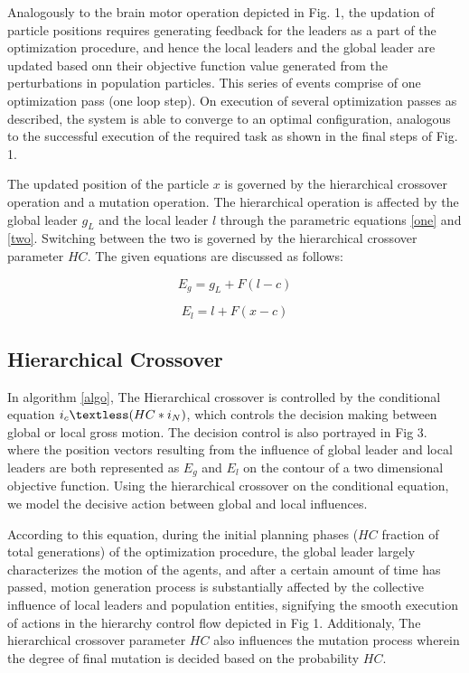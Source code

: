 Analogously to the brain motor operation depicted in Fig. 1, the updation of particle positions requires generating feedback for the leaders as a part of the optimization procedure, and hence the local leaders and the global leader are updated based onn their objective function value generated from the perturbations in population particles. This series of events comprise of one optimization pass (one loop step). On execution of several optimization passes as described, the system is able to converge to an optimal configuration, analogous to the successful execution of the required task as shown in the final steps of Fig. 1.

The updated position of the particle $x$ is governed by the hierarchical crossover operation and a mutation operation. The hierarchical operation is affected by the global leader $g_L$ and the local leader $l$ through the parametric equations \eqref{one} and \eqref{two}. Switching between the two is governed by the hierarchical crossover parameter $HC$. The given equations are discussed as follows:

\begin{equation}
\label{one}
E_g = g_L + F (l - c)
\end{equation}

\begin{equation}
\label{two}
E_l = l + F (x - c)
\end{equation}

\subsection{Hierarchical Crossover}

In algorithm \ref{algo}, The Hierarchical crossover is controlled by the conditional equation $i_c \textless (HC*i_N)$, which controls the decision making between global or local gross motion. The decision control is also portrayed in Fig 3. where the position vectors resulting from the influence of global leader and local leaders are both represented as $E_g$ and $E_l$ on the contour of a two dimensional objective function. Using the hierarchical crossover on the conditional equation, we model the decisive action between global and local influences.

According to this equation, during the initial planning phases ($HC$ fraction of total generations) of the optimization procedure, the global leader largely characterizes the motion of the agents, and after a certain amount of time has passed, motion generation process is substantially affected by the collective influence of local leaders and population entities, signifying the smooth execution of actions in the hierarchy control flow depicted in Fig 1.
Additionaly, The hierarchical crossover parameter $HC$ also influences the mutation process wherein the degree of final mutation is decided based on the probability $HC$.

